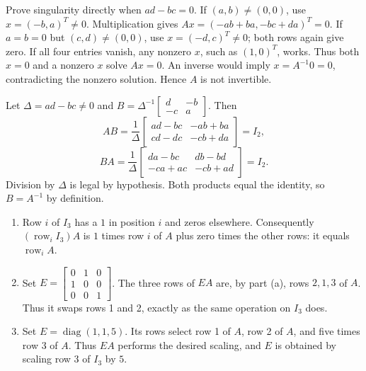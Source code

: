 \goal Prove singularity directly when $ad-bc=0$.
If $(a,b)\ne(0,0)$, use $x=(-b,a)^T\ne0$. Multiplication gives
$Ax=(-ab+ba,-bc+da)^T=0$.
If $a=b=0$ but $(c,d)\ne(0,0)$, use $x=(-d,c)^T\ne0$;
both rows again give zero. If all four entries vanish, any nonzero
$x$, such as $(1,0)^T$, works.
Thus both $x=0$ and a nonzero $x$ solve $Ax=0$. An inverse would imply
$x=A^{-1}0=0$, contradicting the nonzero solution. Hence $A$ is not invertible.

Let $\Delta=ad-bc\ne0$ and
$B=\Delta^{-1}\begin{bmatrix}d&-b\\-c&a\end{bmatrix}$. Then
\[
 AB=\frac1\Delta\begin{bmatrix}ad-bc&-ab+ba\\cd-dc&-cb+da\end{bmatrix}=I_2,
\]
\[
 BA=\frac1\Delta\begin{bmatrix}da-bc&db-bd\\-ca+ac&-cb+ad\end{bmatrix}=I_2.
\]
Division by $\Delta$ is legal by hypothesis. Both products equal the
identity, so $B=A^{-1}$ by definition.

\begin{enumerate}[label=(\alph*)]
\item Row $i$ of $I_3$ has a $1$ in position $i$ and zeros elsewhere.
Consequently $(\operatorname{row}_iI_3)A$ is $1$ times row $i$ of $A$
plus zero times the other rows: it equals $\operatorname{row}_iA$.
\item Set $E=\begin{bmatrix}0&1&0\\1&0&0\\0&0&1\end{bmatrix}$.
The three rows of $EA$ are, by part (a), rows $2,1,3$ of $A$.
Thus it swaps rows 1 and 2, exactly as the same operation on $I_3$ does.
\item Set $E=\operatorname{diag}(1,1,5)$. Its rows select row 1 of $A$,
row 2 of $A$, and five times row 3 of $A$. Thus $EA$ performs the desired
scaling, and $E$ is obtained by scaling row 3 of $I_3$ by $5$.
\end{enumerate}

